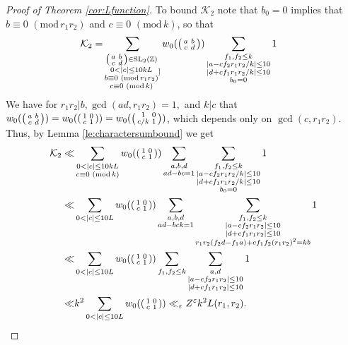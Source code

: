 \documentclass[12pt]{amsart}
\theoremstyle{definition}
\theoremstyle{remark}
\numberwithin{equation}{section}
\newcommand{\Z}{{\mathbb Z}}
\newcommand{\1}{{\mathbf 1}}
\newcommand{\eps}{\varepsilon}
\newcommand{\SL}{\operatorname{SL}_2}
\renewcommand{\pmod}[1]{\,\,(\mathrm{mod}\,{#1})}
\begin{document}
\begin{proof}[Proof of Theorem \ref{cor:Lfunction}]
To bound $\mathcal{K}_2$ note that $b_0 = 0$ implies that $b \equiv 0 \pmod{r_1r_2}$ and $c \equiv 0 \pmod{k}$, so that
\begin{align*}
   \mathcal{K}_{2} = &   \sum_{\substack{\smqty(a &  b \\ c & d) \in \SL(\Z) \\  0< |c| \leq 10 k L \\ b \equiv 0 \pmod{r_1r_2} \\ c \equiv 0 \pmod{k}}] } w_0(\smqty(a &  b \\ c & d) ) \sum_{\substack{ f_1,f_2 \leq k \\ |a - c f_2 r_1r_2/k | \leq 10 \\   | d + c f_1 r_1r_2/k |  \leq 10 \\ b_0 = 0 }} 1   
  \end{align*} 
 We have for $r_1r_2 | b, \gcd(ad,r_1r_2)=1,$ and $k|c$ that $w_0(\smqty(a &  b \\ c & d) )  = w_0(\smqty(1 &  0 \\ c & 1) ) =w_0(\smqty(1 &  0 \\ c/k & 1) )$, which depends only on $\gcd(c,r_1r_2)$. Thus, by Lemma \ref{le:charactersumbound} we get
  \begin{align*}
      \mathcal{K}_{2} \ll  &   \sum_{\substack{ 0< |c| \leq 10 k L \\ c \equiv 0 \pmod{k} } } w_0(\smqty(1 &  0 \\ c & 1) ) \sum_{\substack{a,b,d \\ ad-bc=1}}\sum_{\substack{ f_1,f_2 \leq k \\ |a - c f_2 r_1r_2/k | \leq 10 \\   | d + c f_1 r_1r_2/k |  \leq 10 \\ b_0 = 0 }} 1  \\
      \ll & \sum_{\substack{ 0< |c| \leq 10  L  } } w_0(\smqty(1 &  0 \\ c & 1) )\sum_{\substack{a,b,d \\ ad-bc k =1}}\sum_{\substack{ f_1,f_2 \leq k \\ |a - c f_2 r_1r_2 | \leq 10 \\   | d + c f_1 r_1r_2 |  \leq 10 \\ r_1r_2(f_2d-f_1 a) + c f_1f_2 (r_1r_2)^2 = kb }} 1
      \\
      \ll & \sum_{\substack{ 0< |c| \leq 10  L  } } w_0(\smqty(1 &  0 \\ c & 1) )\sum_{\substack{ f_1,f_2 \leq k }}\sum_{\substack{a,d \\ |a - c f_2 r_1r_2 | \leq 10 \\   | d + c f_1 r_1r_2 |  \leq 10 }} 1 \\
       \ll & k^2 \sum_{\substack{ 0< |c| \leq 10  L  } } w_0(\smqty(1 &  0 \\ c & 1) ) \ll_\eps Z^{\eps} k^2 L (r_1,r_2).
  \end{align*}



\end{proof}
\end{document}
